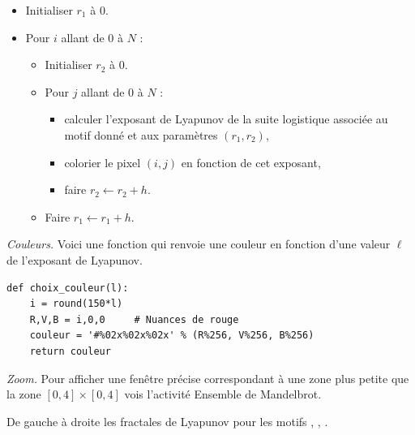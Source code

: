 \documentclass[11pt,class=report,crop=false]{standalone}
\begin{document}
\begin{activite}
\begin{enumerate}
\begin{itemize}
  \item Initialiser $r_1$ à $0$.
  \item Pour $i$ allant de $0$ à $N$ :
  \begin{itemize}
    \item Initialiser $r_2$ à $0$.
    \item Pour $j$ allant de $0$ à $N$ :
    \begin{itemize}
      \item calculer l'exposant de Lyapunov de la suite logistique associée au motif donné et aux paramètres $(r_1,r_2)$,
      \item colorier le pixel $(i,j)$ en fonction de cet exposant,
      \item faire $r_2 \leftarrow r_2 + h$.
    \end{itemize} 
    \item Faire $r_1 \leftarrow r_1 + h$.
  \end{itemize} 
\end{itemize}  
    

    
    
\end{enumerate} 


\emph{Couleurs.} Voici  une fonction qui renvoie une couleur en fonction d'une valeur $\ell$ de l'exposant de Lyapunov.

\begin{lstlisting}
def choix_couleur(l):
    i = round(150*l)
    R,V,B = i,0,0     # Nuances de rouge
    couleur = '#%02x%02x%02x' % (R%256, V%256, B%256)
    return couleur
\end{lstlisting}  
    
\emph{Zoom.} Pour afficher une fenêtre précise correspondant à une zone plus petite que la zone $[0,4] \times [0,4]$ vois l'activité \og{}Ensemble de Mandelbrot\fg{}.

\bigskip

De gauche à droite les fractales de Lyapunov pour les motifs
,
,
.


\end{activite}
\end{document}
